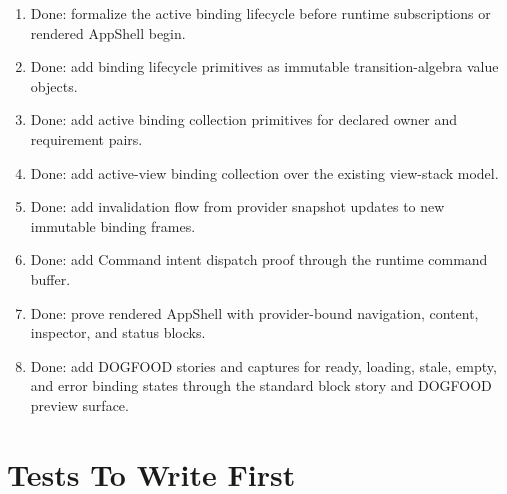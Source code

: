 \begin{enumerate}
\item
  Done: formalize the active binding lifecycle before runtime subscriptions or rendered AppShell begin.
\item
  Done: add binding lifecycle primitives as immutable transition-algebra value objects.
\item
  Done: add active binding collection primitives for declared owner and requirement pairs.
\item
  Done: add active-view binding collection over the existing view-stack model.
\item
  Done: add invalidation flow from provider snapshot updates to new immutable binding frames.
\item
  Done: add Command intent dispatch proof through the runtime command buffer.
\item
  Done: prove rendered AppShell with provider-bound navigation, content, inspector, and status blocks.
\item
  Done: add DOGFOOD stories and captures for ready, loading, stale, empty, and error binding states through the standard block story and DOGFOOD preview surface.
\end{enumerate}

\section{Tests To Write First}\label{record-132-tests-to-write-first}

